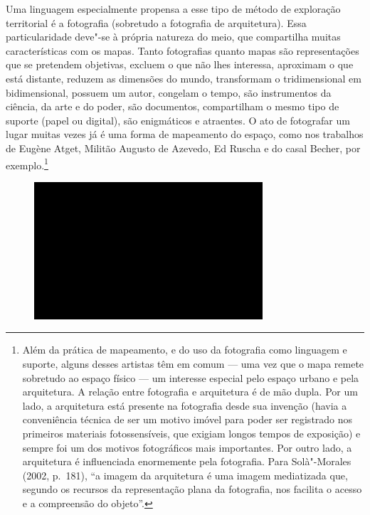 Uma linguagem especialmente propensa a esse tipo de método de exploração
territorial é a fotografia (sobretudo a fotografia de arquitetura). Essa
particularidade deve"-se à própria natureza do meio, que compartilha
muitas características com os mapas. Tanto fotografias quanto mapas são
representações que se pretendem objetivas, excluem o que não lhes
interessa, aproximam o que está distante, reduzem as dimensões do mundo,
transformam o tridimensional em bidimensional, possuem um autor,
congelam o tempo, são instrumentos da ciência, da arte e do poder, são
documentos, compartilham o mesmo tipo de suporte (papel ou digital), são enigmáticos e atraentes. O ato de fotografar um
lugar muitas vezes já é uma forma de mapeamento do espaço, como nos
trabalhos de Eugène Atget, Militão Augusto de Azevedo, Ed Ruscha e do
casal Becher, por exemplo.\footnote{Além da prática de mapeamento, e do
  uso da fotografia como linguagem e suporte, alguns desses artistas têm
  em comum --- uma vez que o mapa remete sobretudo ao espaço físico --- um
  interesse especial pelo espaço urbano e pela arquitetura. A relação
  entre fotografia e arquitetura é de mão dupla. Por um lado, a
  arquitetura está presente na fotografia desde sua invenção (havia a
  conveniência técnica de ser um motivo imóvel para poder ser registrado
  nos primeiros materiais fotossensíveis, que exigiam longos tempos de
  exposição) e sempre foi um dos motivos fotográficos mais importantes.
  Por outro lado, a arquitetura é influenciada enormemente pela
  fotografia. Para Solà"-Morales (2002, p.~181), ``a imagem da
  arquitetura é uma imagem mediatizada que, segundo os recursos da
  representação plana da fotografia, nos facilita o acesso e a
  compreensão do objeto''.}

\begin{figure}[!ht]

\centering
 \includegraphics[width=85mm]{./imgs/im1.jpg}
\caption{\tiny{}}

\end{figure}

